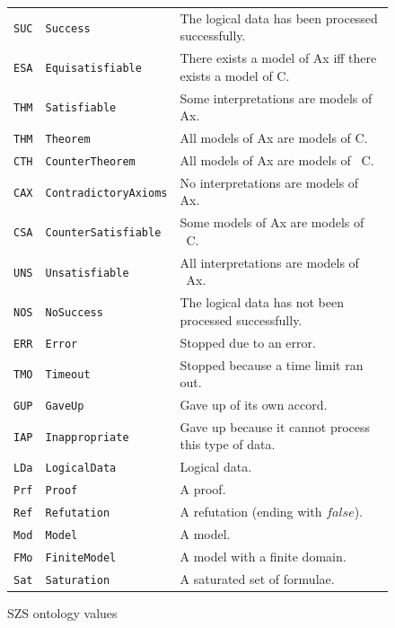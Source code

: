 \documentclass{easychair}
\begin{document}
\begin{figure}[htb]
\centering
\begin{tabular}{lll}
\hline
{\tt SUC} & {\tt Success}             & 
The logical data has been processed successfully. \\
{\tt ESA} & {\tt Equisatisfiable}     & 
There exists a model of Ax iff there exists a model of C.\\
{\tt THM} & {\tt Satisfiable}         & 
Some interpretations are models of Ax.\\
{\tt THM} & {\tt Theorem}             & 
All models of Ax are models of C.\\
{\tt CTH} & {\tt CounterTheorem}      & 
All models of Ax are models of ~C.\\
{\tt CAX} & {\tt ContradictoryAxioms} & 
No interpretations are models of Ax.\\
{\tt CSA} & {\tt CounterSatisfiable}  & 
Some models of Ax are models of ~C.\\
{\tt UNS} & {\tt Unsatisfiable}       & 
All interpretations are models of ~Ax.\\
\hline
{\tt NOS} & {\tt NoSuccess}           & 
The logical data has not been processed successfully. \\
{\tt ERR} & {\tt Error}               & 
Stopped due to an error. \\
{\tt TMO} & {\tt Timeout}             & 
Stopped because a time limit ran out. \\
{\tt GUP} & {\tt GaveUp}              & 
Gave up of its own accord. \\
{\tt IAP} & {\tt Inappropriate}       & 
Gave up because it cannot process this type of data. \\
\hline
{\tt LDa} & {\tt LogicalData}         & 
Logical data. \\
{\tt Prf} & {\tt Proof}               & 
A proof. \\
{\tt Ref} & {\tt Refutation}          & 
A refutation (ending with $false$). \\
{\tt Mod} & {\tt Model}               & 
A model. \\
{\tt FMo} & {\tt FiniteModel}         & 
A model with a finite domain. \\
{\tt Sat} & {\tt Saturation}          & 
A saturated set of formulae. \\
\hline
\end{tabular}
\caption{SZS ontology values}
\label{SZSTable}
\end{figure} 
\end{document}
